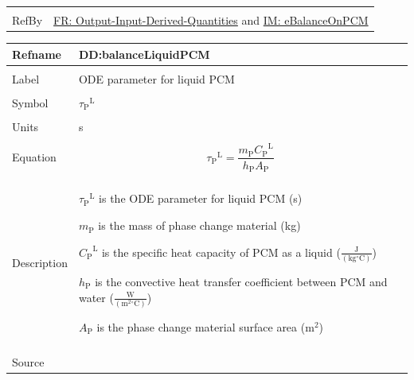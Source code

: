 \documentclass[12pt]{article}
\begin{document}
\begin{minipage}{\textwidth}
\begin{tabular}{>{\raggedright}p{}>{\raggedright\arraybackslash}p{}}
\\ \midrule \\
RefBy & \hyperref[outputInputDerivQuants]{FR: Output-Input-Derived-Quantities} and \hyperref[IM:eBalanceOnPCM]{IM: eBalanceOnPCM}
        
\\ \bottomrule
\end{tabular}
\end{minipage}

\vspace{\baselineskip}
\noindent
\begin{minipage}{\textwidth}
\begin{tabular}{>{\raggedright}p{}>{\raggedright\arraybackslash}p{}}
\toprule \textbf{Refname} & \textbf{DD:balanceLiquidPCM}
\label{DD:balanceLiquidPCM}
\\ \midrule \\
Label & ODE parameter for liquid PCM
        
\\ \midrule \\
Symbol & ${{τ_{\text{P}}}^{\text{L}}}$
         
\\ \midrule \\
Units & s
        
\\ \midrule \\
Equation & \begin{displaymath}
           {{τ_{\text{P}}}^{\text{L}}}=\frac{{m_{\text{P}}} {{C_{\text{P}}}^{\text{L}}}}{{h_{\text{P}}} {A_{\text{P}}}}
           \end{displaymath}
\\ \midrule \\
Description & \begin{symbDescription}
              \item{${{τ_{\text{P}}}^{\text{L}}}$ is the ODE parameter for liquid PCM (s)}
              \item{${m_{\text{P}}}$ is the mass of phase change material (kg)}
              \item{${{C_{\text{P}}}^{\text{L}}}$ is the specific heat capacity of PCM as a liquid ($\frac{\text{J}}{(\text{kg}{}^{\circ}\text{C})}$)}
              \item{${h_{\text{P}}}$ is the convective heat transfer coefficient between PCM and water ($\frac{\text{W}}{(\text{m}^{2}{}^{\circ}\text{C})}$)}
              \item{${A_{\text{P}}}$ is the phase change material surface area ($\text{m}^{2}$)}
              \end{symbDescription}
\\ \midrule \\
Source & \cite{lightstone2012}
         

\end{tabular}
\end{minipage}
\end{document}
